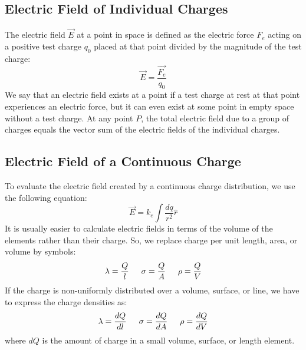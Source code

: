 \documentclass{article}
\begin{document}
	\subsection{Electric Field of Individual Charges}
    	The electric field $\vec{E}$ at a point in space is defined as the electric force $F_e$ acting on a positive test charge $q_0$ placed at that point divided by the magnitude of the test charge:
        \[
        	\vec{E}=\frac{\vec{F_e}}{q_0}
        \]
        We say that an electric field exists at a point if a test charge at rest at that point experiences an electric force, but it can even exist at some point in empty space without a test charge. At any point $P$, the total electric field due to a group of charges equals the vector sum of the electric fields of the individual charges.
        
	\subsection{Electric Field of a Continuous Charge}
    	To evaluate the electric field created by a continuous charge distribution, we use the following equation:
        \[
        	\vec{E}=k_e\int\frac{dq}{r^2}\hat{r}
        \]
        It is usually easier to calculate electric fields in terms of the volume of the elements rather than their charge. So, we replace charge per unit length, area, or volume by symbols:
        \[
        	\lambda=\frac{Q}{l} \indent
            \sigma=\frac{Q}{A} \indent
            \rho=\frac{Q}{V}
        \]
        If the charge is non-uniformly distributed over a volume, surface, or line, we have to express the charge densities as:
        \[
        	\lambda=\frac{dQ}{dl} \indent
            \sigma=\frac{dQ}{dA} \indent
            \rho=\frac{dQ}{dV}
        \]
        where $dQ$ is the amount of charge in a small volume, surface, or length element.
\end{document}
